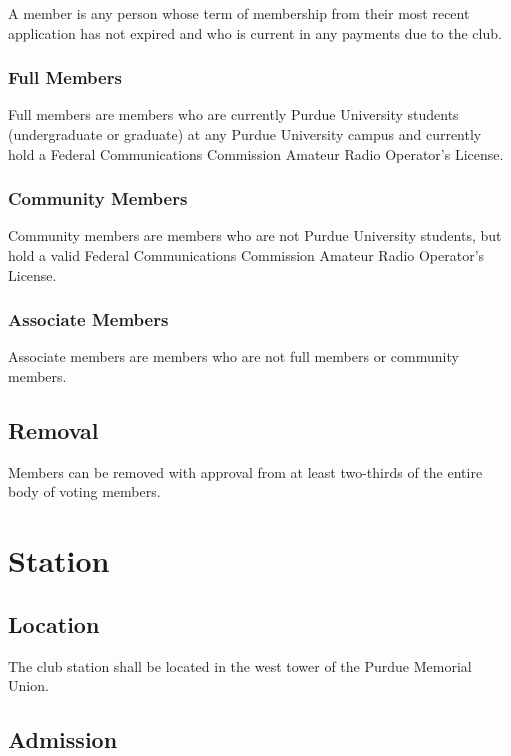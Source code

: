 \documentclass{article}
\begin{document}
A member is any person whose term of membership from their most recent
application has not expired and who is current in any payments due to the club.

\subsubsection{Full Members}

Full members are members who are currently Purdue University students
(undergraduate or graduate) at any Purdue University campus and currently hold a
Federal Communications Commission Amateur Radio Operator's License.

\subsubsection{Community Members}

Community members are members who are not Purdue University students, but hold a
valid Federal Communications Commission Amateur Radio Operator's License.

\subsubsection{Associate Members}

Associate members are members who are not full members or community members.

\subsection{Removal}

Members can be removed with approval from at least two-thirds of the entire body
of voting members.

\section{Station}

\subsection{Location}

The club station shall be located in the west tower of the Purdue Memorial
Union.

\subsection{Admission}
\end{document}

